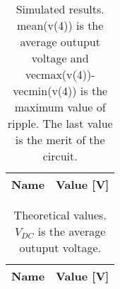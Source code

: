 \begin{table}[h]
  \centering
  \begin{tabular}{|l|r|}
    \hline    
    {\bf Name} & {\bf Value [V]} \\ \hline
    
  \end{tabular}
  \caption{Simulated results. mean(v(4)) is the average outuput voltage and vecmax(v(4))-vecmin(v(4)) is the maximum value of ripple. The last value is the merit of the circuit.}
  
  \label{tab:sim}
\end{table}

\begin{table}[h]
  \centering
  \begin{tabular}{|l|r|}
    \hline    
    {\bf Name} & {\bf Value [V]} \\ \hline
    
  \end{tabular}
  \caption{Theoretical values. $V_{DC}$ is the average outuput voltage.}
  \label{tab:tab1}
\end{table}










